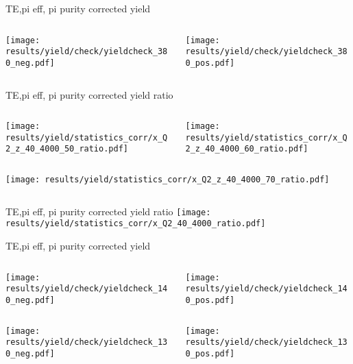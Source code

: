 \begin{frame}{TE,pi eff, pi purity corrected yield}
\begin{columns}
\begin{column}[T]{0.5\textwidth}
\texttt{[image: results/yield/check/yieldcheck\_380\_neg.pdf]}
\end{column}
\begin{column}[T]{0.5\textwidth}
\texttt{[image: results/yield/check/yieldcheck\_380\_pos.pdf]}
\end{column}
\end{columns}
\end{frame}
\begin{frame}{TE,pi eff, pi purity corrected yield ratio}
\begin{columns}
\begin{column}[T]{0.5\textwidth}
\texttt{[image: results/yield/statistics\_corr/x\_Q2\_z\_40\_4000\_50\_ratio.pdf]}
\end{column}
\begin{column}[T]{0.5\textwidth}
\texttt{[image: results/yield/statistics\_corr/x\_Q2\_z\_40\_4000\_60\_ratio.pdf]}
\end{column}
\end{columns}
\begin{columns}
\begin{column}[T]{0.5\textwidth}
\texttt{[image: results/yield/statistics\_corr/x\_Q2\_z\_40\_4000\_70\_ratio.pdf]}
\end{column}
\begin{column}[T]{0.5\textwidth}
\end{column}
\end{columns}
\end{frame}
\begin{frame}{TE,pi eff, pi purity corrected yield ratio}
\texttt{[image: results/yield/statistics\_corr/x\_Q2\_40\_4000\_ratio.pdf]}
\end{frame}
\begin{frame}{TE,pi eff, pi purity corrected yield}
\begin{columns}
\begin{column}[T]{0.5\textwidth}
\texttt{[image: results/yield/check/yieldcheck\_140\_neg.pdf]}
\end{column}
\begin{column}[T]{0.5\textwidth}
\texttt{[image: results/yield/check/yieldcheck\_140\_pos.pdf]}
\end{column}
\end{columns}
\begin{columns}
\begin{column}[T]{0.5\textwidth}
\texttt{[image: results/yield/check/yieldcheck\_130\_neg.pdf]}
\end{column}
\begin{column}[T]{0.5\textwidth}
\texttt{[image: results/yield/check/yieldcheck\_130\_pos.pdf]}
\end{column}
\end{columns}
\end{frame}
